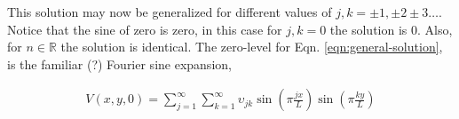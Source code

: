 \documentclass{tufte-book}
\begin{document}
This solution may now be generalized for different values of $j, k = \pm 1, \pm 2 \pm 3 \ldots$. Notice that the sine of zero is zero, in this case for $j,k = 0$ the solution is $0$. Also, for $n \in \mathbb{R}$ the solution is identical. The zero-level for Eqn. \eqref{eqn:general-solution}, is the familiar (?) Fourier sine expansion,

\begin{eqnarray}
\label{eqn:fourier-sine-expansion}
V(x, y, 0) = \sum_{j=1}^{\infty}\sum_{k=1}^{\infty} \upsilon_{jk} \sin \left( \pi \frac{jx}{L}\right) \sin\left( \pi \frac{k y}{L}\right)
\end{eqnarray}









\backmatter





\printindex
\end{document}
